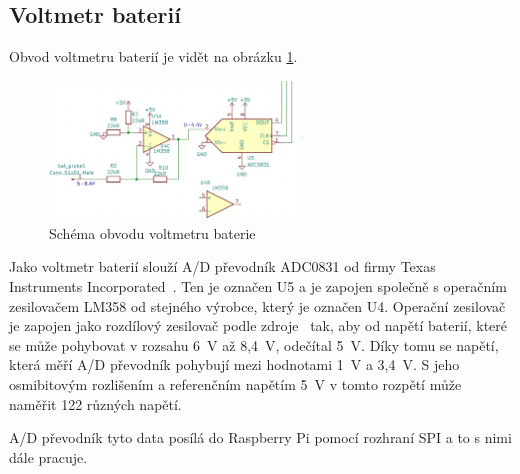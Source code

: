 \subsection{Voltmetr baterií}
Obvod voltmetru baterií je vidět na obrázku \ref{fig:bat_probe}.

\begin{figure}[htb]
  \centering
  \includegraphics[width=0.6\textwidth]{img/bat_probe.jpg}
  \caption{\label{fig:bat_probe} Schéma obvodu voltmetru baterie}
\end{figure}

Jako voltmetr baterií slouží A/D převodník ADC0831 od firmy Texas Instruments Incorporated~\cite{adc0831-dsh}. Ten je označen U5 a je zapojen společně s operačním zesilovačem LM358 od stejného výrobce, který je označen U4.
Operační zesilovač je zapojen jako rozdílový zesilovač podle zdroje~\cite{odcitacka} tak, aby od napětí baterií, které se může pohybovat v rozsahu 6~V až 8,4~V, odečítal 5~V.
Díky tomu se napětí, která měří A/D převodník pohybují mezi hodnotami 1~V a 3,4~V. S jeho osmibitovým rozlišením a referenčním napětím 5~V v tomto rozpětí může naměřit 122 různých napětí.

A/D převodník tyto data posílá do Raspberry Pi pomocí rozhraní SPI a to s nimi dále pracuje.
